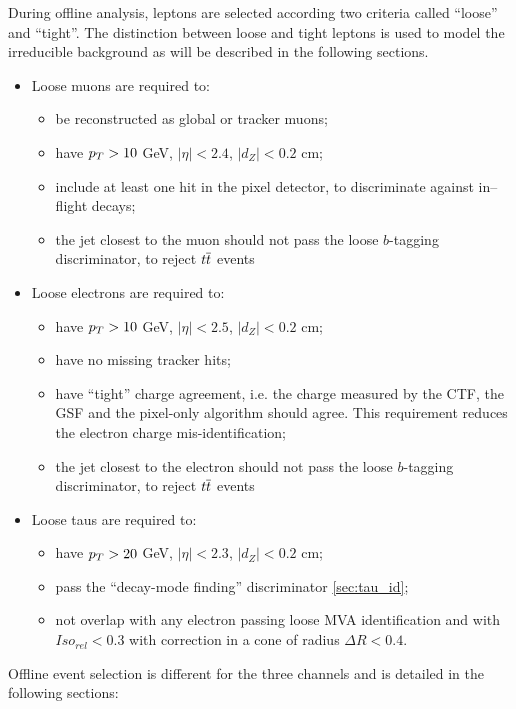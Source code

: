 During offline analysis, leptons are selected according two criteria called ``loose'' and ``tight''. The distinction between loose and tight leptons is used to model the irreducible background as will be described in the following sections. 

\begin{itemize}
\item Loose muons are required to:
\begin{itemize}
\item be reconstructed as global or tracker muons;
\item have $p_{T} > 10$ GeV, $|\eta| < 2.4$, $|d_Z| < 0.2$ cm;
\item include at least one hit in the pixel detector, to discriminate against in--flight decays;
\item the jet closest to the muon should not pass the loose $b$-tagging discriminator, to reject $t\overline{t}$ events
\end{itemize}

\item Loose electrons are required to:
\begin{itemize}
\item have $p_{T} > 10$ GeV, $|\eta| < 2.5$, $|d_Z| < 0.2$ cm;
\item have no missing tracker hits; 
\item have ``tight'' charge agreement, i.e. the charge measured by the CTF, the GSF and the pixel-only algorithm should agree. This requirement reduces the electron charge mis-identification;
\item the jet closest to the electron should not pass the loose $b$-tagging discriminator, to reject $t\overline{t}$ events
\end{itemize}

\item Loose taus are required to:
\begin{itemize}
\item have $p_{T} > 20$ GeV, $|\eta| < 2.3$, $|d_Z| < 0.2$ cm;
\item pass the ``decay-mode finding'' discriminator \ref{sec:tau_id}; 
\item not overlap with any electron passing loose MVA identification and with $Iso_{rel} < 0.3$ with \db correction in a cone of radius $\Delta R < 0.4$.
\end{itemize}

\end{itemize}

Offline event selection is different for the three channels and is detailed in the following sections:


